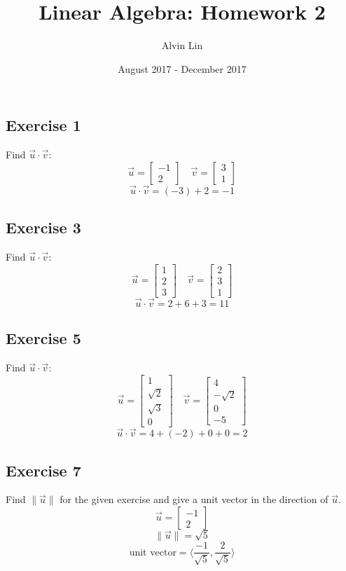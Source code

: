 \documentclass{math}
\title{Linear Algebra: Homework 2}
\author{Alvin Lin}
\date{August 2017 - December 2017}
\begin{document}
\maketitle

\subsection*{Exercise 1}
Find \( \vec{u}\cdot\vec{v} \):
\[ \vec{u} = \begin{bmatrix}-1 \\ 2\end{bmatrix} \quad
  \vec{v} = \begin{bmatrix}3 \\ 1\end{bmatrix} \]
\[ \vec{u}\cdot\vec{v} = (-3)+2 = -1 \]

\subsection*{Exercise 3}
Find \( \vec{u}\cdot\vec{v} \):
\[ \vec{u} = \begin{bmatrix}1 \\ 2 \\ 3\end{bmatrix} \quad
  \vec{v} = \begin{bmatrix}2 \\ 3 \\ 1\end{bmatrix} \]
\[ \vec{u}\cdot\vec{v} = 2+6+3 = 11 \]

\subsection*{Exercise 5}
Find \( \vec{u}\cdot\vec{v} \):
\[ \vec{u} = \begin{bmatrix}1 \\ \sqrt{2} \\ \sqrt{3} \\ 0\end{bmatrix} \quad
  \vec{v} = \begin{bmatrix}4 \\ -\sqrt{2} \\ 0 \\ -5\end{bmatrix} \]
\[ \vec{u}\cdot\vec{v} = 4+(-2)+0+0 = 2 \]

\subsection*{Exercise 7}
Find \( \|\vec{u}\| \) for the given exercise and give a unit vector in the
direction of \( \vec{u} \).
\[ \vec{u} = \begin{bmatrix}-1 \\ 2\end{bmatrix} \]
\[ \|\vec{u}\| = \sqrt{5} \]
\[ \text{unit vector} = \langle\frac{-1}{\sqrt{5}},\frac{2}{\sqrt{5}}\rangle \]
\end{document}
